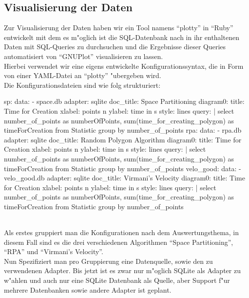   \subsection{Visualisierung der Daten}
    Zur Visualisierung der Daten haben wir ein Tool namens \enquote{plotty} in 
    \enquote{Ruby} entwickelt mit dem es m"oglich ist die SQL-Datenbank nach in
    ihr enthaltenen Daten mit SQL-Queries zu durchsuchen und die Ergebnisse 
    dieser Queries automatisiert von \enquote{GNUPlot} visualisieren zu lassen.\\
    Hierbei verwendet wir eine eigens entwickelte Konfigurationssyntax, die 
    in Form von einer YAML-Datei an \enquote{plotty} "ubergeben wird.\\
    Die Konfigurationsdateien sind wie folg strukturiert:\\
        \begin{code}[caption={Plotkonfiguration},label=listing_plotconfiguration]
sp:
  data: 
    - space.db
  adapter: sqlite
  doc_title: Space Partitioning
  diagram0:
    title: Time for Creation
    xlabel: points n
    ylabel: time in s
    style: lines
    query: |
      select number_of_points as numberOfPoints, sum(time_for_creating_polygon) as 
      timeForCreation from Statistic group by number_of_points
rpa:
  data: 
    - rpa.db
  adapter: sqlite
  doc_title: Random Polygon Algorithm
  diagram0:
    title: Time for Creation
    xlabel: points n
    ylabel: time in s
    style: lines
    query: |
      select number_of_points as numberOfPoints, sum(time_for_creating_polygon) as 
      timeForCreation from Statistic group by number_of_points
velo_good:
  data: 
    - velo_good.db
  adapter: sqlite
  doc_title: Virmani's Velocity
  diagram0:
    title: Time for Creation
    xlabel: points n
    ylabel: time in s
    style: lines
    query: |
      select number_of_points as numberOfPoints, sum(time_for_creating_polygon) as 
      timeForCreation from Statistic group by number_of_points
    \end{code}\\
    Als erstes gruppiert man die Konfigurationen nach dem Auswertungsthema,
    in diesem Fall sind es die drei verschiedenen Algorithmen
    \enquote{Space Partitioning}, \enquote{RPA} und 
    \enquote{Virmani's Velocity}.\\
    Nun Spezifiziert man pro Gruppierung eine Datenquelle, sowie den zu 
    verwendenen Adapter. Bis jetzt ist es zwar nur m"oglich SQLite als Adapter
    zu w"ahlen und auch nur eine SQLite Datenbank als Quelle, aber Support 
    f"ur mehrere Datenbanken sowie andere Adapter ist geplant.\\
